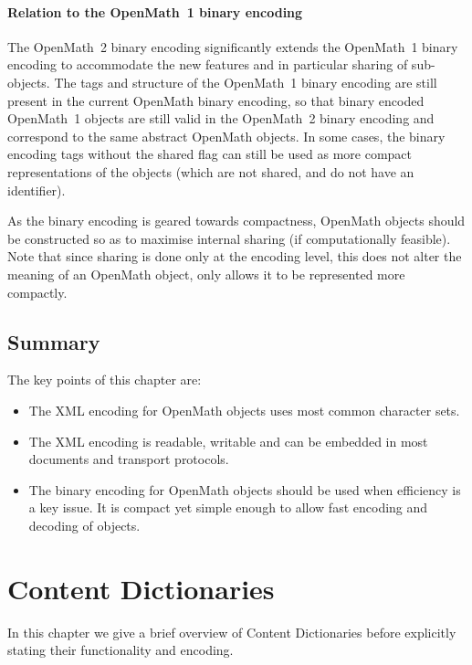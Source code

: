 \documentclass{report}
\def\OM{OpenMath\xspace}
\def\XML{XML\xspace}
\begin{document}
\subsubsection{Relation to the \OM~1 binary encoding}\label{sec_relation_OM1_binary}

The \OM~2 binary encoding significantly extends the \OM~1 binary encoding to accommodate
the new features and in particular sharing of sub-objects. The tags and structure of the
\OM~1 binary encoding are still present in the current \OM binary encoding, so that binary
encoded \OM~1 objects are still valid in the \OM~2 binary encoding and correspond to the
same abstract \OM objects. In some cases, the binary encoding tags without the shared flag
can still be used as more compact representations of the objects (which are not shared,
and do not have an identifier).
  

As the binary encoding is geared towards compactness, \OM objects should be constructed so
as to maximise internal sharing (if computationally feasible). Note that since sharing is
done only at the encoding level, this does not alter the meaning of an \OM object, only
allows it to be represented more compactly.
  
\section{Summary}\label{sec_enc_summary}
  
The key points of this chapter are:
\begin{itemize}
\item The \XML encoding for \OM objects uses most common character sets.
\item The \XML encoding is readable, writable and can be embedded in most documents and
  transport protocols.
\item The binary encoding for \OM objects should be used when efficiency is a key
  issue. It is compact yet simple enough to allow fast encoding and decoding of objects.
\end{itemize}
  



\chapter{Content Dictionaries}\label{cha_cd}
  
  
In this chapter we give a brief overview of Content Dictionaries before explicitly stating
their functionality and encoding.
\end{document}
